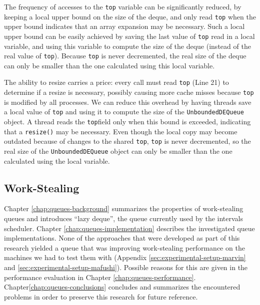 The frequency of accesses to the \lstinline!top! variable can be
significantly reduced, by keeping a local upper bound on the size of
the deque, and only read \lstinline!top! when the upper bound
indicates that an array expansion may be necessary. Such a local upper
bound can be easily achieved by saving the last value of
\lstinline!top! read in a local variable, and using this variable to
compute the size of the deque (instead of the real value of
\lstinline!top!). Because \lstinline!top! is never decremented, the
real size of the deque can only be smaller than the one calculated
using this local variable.


The ability to resize carries a price: every call must read
\lstinline!top! (Line 21) to determine if a resize is necessary,
possibly causing more cache misses because \lstinline!top!  is
modified by all processes. We can reduce this overhead by having
threads save a local value of \lstinline!top!  and using it to compute
the size of the \lstinline!UnboundedDEQueue!  object. A thread reads
the \lstinline!top!field only when this bound is exceeded, indicating
that a \lstinline!resize()! may be necessary.  Even though the local
copy may become outdated because of changes to the shared
\lstinline!top!, \lstinline!top! is never decremented, so the real
size of the \lstinline!UnboundedDEQueue! object can only be smaller
than the one calculated using the local variable.

\subsection{Work-Stealing}

Chapter \ref{chap:queues-background} summarizes the properties of
work-stealing queues and introduces ``lazy deque'', the queue
currently used by the intervals scheduler. Chapter
\ref{chap:queues-implementation} describes the investigated queue
implementations. None of the approaches that were developed as part of
this research yielded a queue that was improving work-stealing
performance on the machines we had to test them with (Appendix
\ref{sec:experimental-setup-marvin} and
\ref{sec:experimental-setup-mafushi}). Possible reasons for this are
given in the performance evaluation in Chapter
\ref{chap:queues-performance}. Chapter\ref{chap:queues-conclusions}
concludes and summarizes the encountered problems in order to preserve
this research for future reference.


